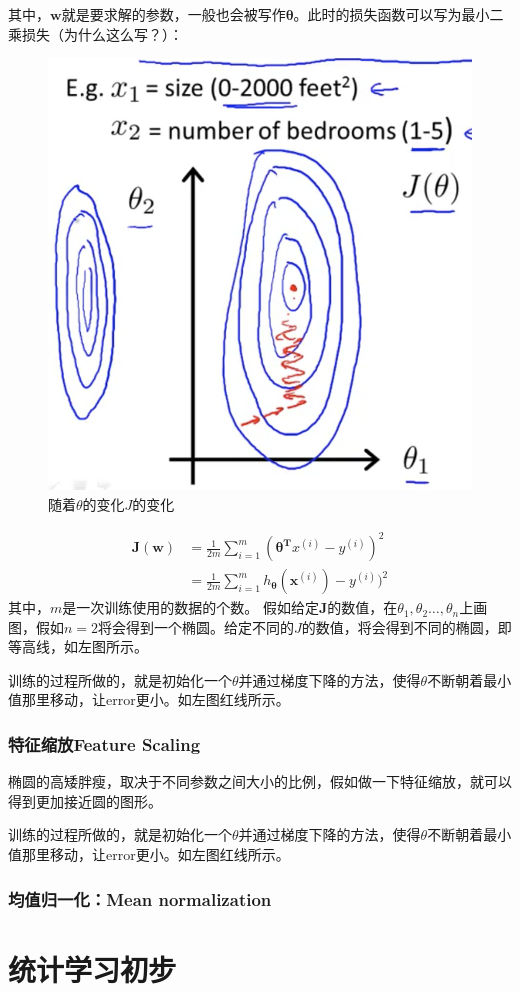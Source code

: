 \documentclass[12pt, letterpaper]{article}
\begin{document}
其中，$\mathbf{w}$就是要求解的参数，一般也会被写作$\mathbf{\theta}$。此时的损失函数可以写为最小二乘损失（\color{red}为什么这么写？）：\color{black}

\begin{figure}
\centering
\includegraphics[scale=0.35]{椭圆.png}
\caption{随着$\theta$的变化$J$的变化}
\end{figure}

$$
\begin{aligned}
\mathbf{J(\mathbf{w})} &= \frac{1}{2m}\sum_{i=1}^{m}(\mathbf{\theta^T}x^{(i)}-y^{(i)})^2\\
&=\frac{1}{2m}\sum_{i=1}^mh_{\mathbf{\theta}}(\mathbf{x}^{(i)})-y^{(i)})^2
\end{aligned}
$$
其中，$m$是一次训练使用的数据的个数。
假如给定$\mathbf{J}$的数值，在$\theta_1,\theta_2\ldots,\theta_n$上画图，假如$n=2$将会得到一个椭圆。给定不同的$J$的数值，将会得到不同的椭圆，即等高线，如左图所示。

训练的过程所做的，就是初始化一个$\theta$并通过梯度下降的方法，使得$\theta$不断朝着最小值那里移动，让error更小。如左图红线所示。

\subsubsection*{特征缩放Feature Scaling}
椭圆的高矮胖瘦，取决于不同参数之间大小的比例，假如做一下特征缩放，就可以得到更加接近圆的图形。

训练的过程所做的，就是初始化一个$\theta$并通过梯度下降的方法，使得$\theta$不断朝着最小值那里移动，让error更小。如左图红线所示。

\subsubsection*{均值归一化：Mean normalization}

\section{统计学习初步}
\end{document}
